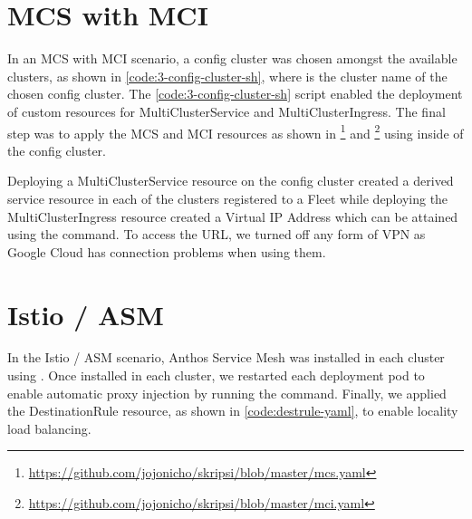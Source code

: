 \section{MCS with MCI}
In an MCS with MCI scenario, a config cluster was chosen amongst the available clusters, as shown in \autoref{code:3-config-cluster-sh}, where  is the cluster name of the chosen config cluster. The \autoref{code:3-config-cluster-sh} script enabled the deployment of custom resources for MultiClusterService and MultiClusterIngress. The final step was to apply the MCS and MCI resources as shown in \footnote{\url{https://github.com/jojonicho/skripsi/blob/master/mcs.yaml}} and \footnote{\url{https://github.com/jojonicho/skripsi/blob/master/mci.yaml}} using  inside of the config cluster.

\vspace{\baselineskip}
\noindent
\begin{minipage}{\linewidth}
% 

\end{minipage}
% 
% 

Deploying a MultiClusterService resource on the config cluster created a derived service resource in each of the clusters registered to a Fleet while deploying the MultiClusterIngress resource created a Virtual IP Address which can be attained using the  command. To access the URL, we turned off any form of VPN as Google Cloud has connection problems when using them.


\section{Istio / ASM}
In the Istio / ASM scenario, Anthos Service Mesh was installed in each cluster using . Once installed in each cluster, we restarted each deployment pod to enable automatic proxy injection by running the  command. Finally, we applied the DestinationRule resource, as shown in \autoref{code:destrule-yaml}, to enable locality load balancing.

